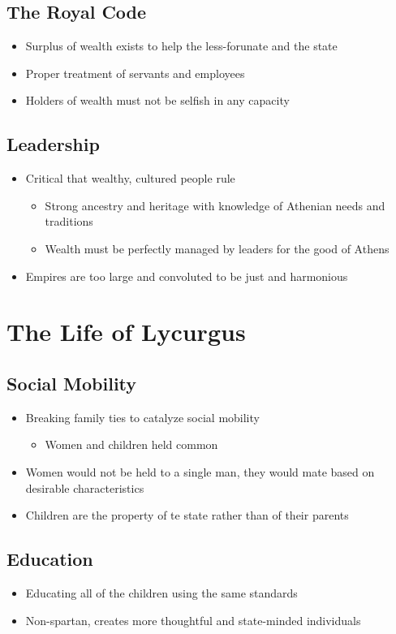 \documentclass[11pt]{article}
\begin{document}
\subsection{The Royal Code}
\label{sec:org2f664ab}
\begin{itemize}
\item Surplus of wealth exists to help the less-forunate and the state
\item Proper treatment of servants and employees
\item Holders of wealth must not be selfish in any capacity
\end{itemize}
\subsection{Leadership}
\label{sec:org47aeb77}
\begin{itemize}
\item Critical that wealthy, cultured people rule
\begin{itemize}
\item Strong ancestry and heritage with knowledge of Athenian needs and traditions
\item Wealth must be perfectly managed by leaders for the good of Athens
\end{itemize}
\item Empires are too large and convoluted to be just and harmonious
\end{itemize}
\section{The Life of Lycurgus}
\label{sec:org9f0b411}
\subsection{Social Mobility}
\label{sec:org33004e1}
\begin{itemize}
\item Breaking family ties to catalyze social mobility
\begin{itemize}
\item Women and children held common
\end{itemize}
\item Women would not be held to a single man, they would mate based on desirable characteristics
\item Children are the property of te state rather than of their parents
\end{itemize}
\subsection{Education}
\label{sec:orgce2b484}
\begin{itemize}
\item Educating all of the children using the same standards
\item Non-spartan, creates more thoughtful and state-minded individuals
\end{itemize}
\end{document}
